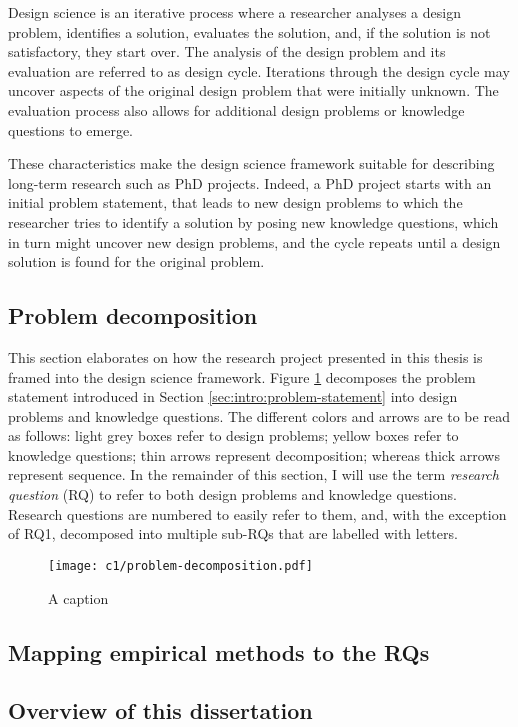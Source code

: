 Design science is an iterative process where a researcher analyses a design problem, identifies a solution, evaluates the solution, and, if the solution is not satisfactory, they start over. 
The analysis of the design problem and its evaluation are referred to as design cycle.
Iterations through the design cycle may uncover aspects of the original design problem that were initially unknown.
The evaluation process also allows for additional design problems or knowledge questions to emerge.

These characteristics make the design science framework suitable for describing long-term research such as PhD projects.
Indeed, a PhD project starts with an initial problem statement, that leads to new design problems to which the researcher tries to identify a solution by posing new knowledge questions, which in turn might uncover new design problems, and the cycle repeats until a design solution is found for the original problem.

\subsection{Problem decomposition}
This section elaborates on how the research project presented in this thesis is framed into the design science framework. 
Figure \ref{fig:intro:problem-decomposition} decomposes the problem statement introduced in Section \ref{sec:intro:problem-statement} into design problems and knowledge questions.
The different colors and arrows are to be read as follows: light grey boxes refer to design problems; yellow boxes refer to knowledge questions; thin arrows represent decomposition; whereas thick arrows represent sequence.
In the remainder of this section, I will use the term \emph{research question} (RQ) to refer to both design problems and knowledge questions.
Research questions are numbered to easily refer to them, and, with the exception of RQ1, decomposed into multiple sub-RQs that are labelled with letters.

\begin{figure}
    \centering
    \texttt{[image: c1/problem-decomposition.pdf]}
    \caption{A caption}\label{fig:intro:problem-decomposition}
\end{figure}

\subsection{Mapping empirical methods to the RQs}

\subsection{Overview of this dissertation}

